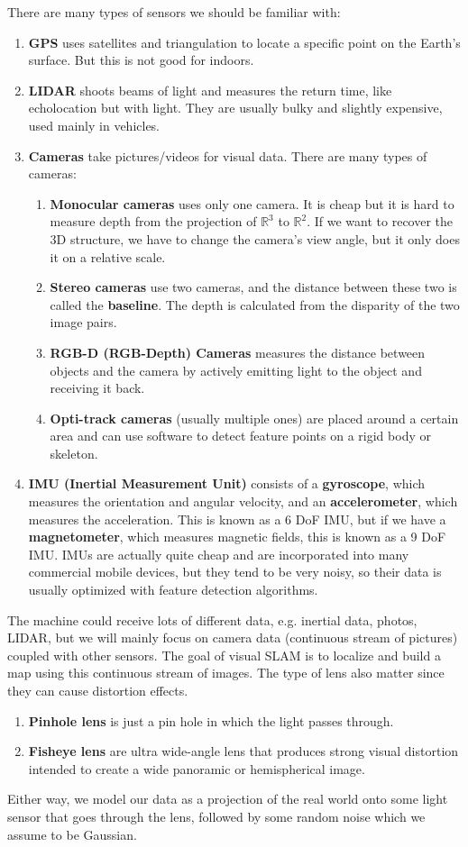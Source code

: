 \documentclass{article}
\theoremstyle{definition}
\theoremstyle{remark}
\theoremstyle{definition}
\begin{document}
There are many types of sensors we should be familiar with: 
\begin{enumerate}
    \item \textbf{GPS} uses satellites and triangulation to locate a specific point on the Earth's surface. But this is not good for indoors. 
    \item \textbf{LIDAR} shoots beams of light and measures the return time, like echolocation but with light. They are usually bulky and slightly expensive, used mainly in vehicles. 
    \item \textbf{Cameras} take pictures/videos for visual data. There are many types of cameras: 
    \begin{enumerate}
        \item \textbf{Monocular cameras} uses only one camera. It is cheap but it is hard to measure depth from the projection of $\mathbb{R}^3$ to $\mathbb{R}^2$. If we want to recover the 3D structure, we have to change the camera's view angle, but it only does it on a relative scale. 
        \item \textbf{Stereo cameras} use two cameras, and the distance between these two is called the \textbf{baseline}. The depth is calculated from the disparity of the two image pairs. 
        \item \textbf{RGB-D (RGB-Depth) Cameras} measures the distance between objects and the camera by actively emitting light to the object and receiving it back. 
        \item \textbf{Opti-track cameras} (usually multiple ones) are placed around a certain area and can use software to detect feature points on a rigid body or skeleton. 
\end{enumerate}
    \item \textbf{IMU (Inertial Measurement Unit)} consists of a \textbf{gyroscope}, which measures the orientation and angular velocity, and an \textbf{accelerometer}, which measures the acceleration. This is known as a 6 DoF IMU, but if we have a \textbf{magnetometer}, which measures magnetic fields, this is known as a 9 DoF IMU. IMUs are actually quite cheap and are incorporated into many commercial mobile devices, but they tend to be very noisy, so their data is usually optimized with feature detection algorithms. 
\end{enumerate}
The machine could receive lots of different data, e.g. inertial data, photos, LIDAR, but we will mainly focus on camera data (continuous stream of pictures) coupled with other sensors. The goal of visual SLAM is to localize and build a map using this continuous stream of images. The type of lens also matter since they can cause distortion effects. 
\begin{enumerate}
    \item \textbf{Pinhole lens} is just a pin hole in which the light passes through. 
    \item \textbf{Fisheye lens} are ultra wide-angle lens that produces strong visual distortion intended to create a wide panoramic or hemispherical image.
\end{enumerate}
Either way, we model our data as a projection of the real world onto some light sensor that goes through the lens, followed by some random noise which we assume to be Gaussian. 
\end{document}
